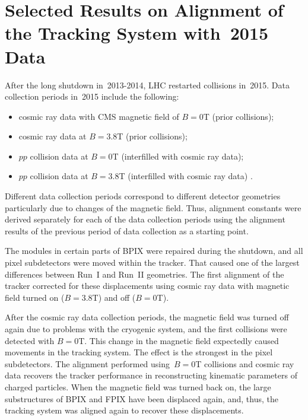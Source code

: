 \section{Selected Results on Alignment of the Tracking System with~2015 Data}
\label{sec:alignmentResults}

After the long shutdown in~2013-2014, LHC restarted collisions in~2015. Data collection periods in~2015 include the following:
\begin{itemize}
  \item cosmic ray data with CMS magnetic field of $B=$0T (prior collisions);
  \item cosmic ray data at $B=$3.8T (prior collisions);
  \item $pp$ collision data at $B=$0T (interfilled with cosmic ray data);
  \item $pp$ collision data at $B=$3.8T (interfilled with cosmic ray data) .
\end{itemize}

Different data collection periods correspond to different detector geometries particularly due to changes of the magnetic field. Thus, alignment constants were derived separately for each of the data collection periods using the alignment results of the previous period of data collection as a starting point. %

The modules in certain parts of BPIX were repaired during the shutdown, and all pixel subdetectors were moved within the tracker. That caused one of the largest differences between Run~I and Run~II geometries. The first alignment of the tracker corrected for these displacements using cosmic ray data with magnetic field turned on ($B=$3.8T) and off ($B=$0T).

After the cosmic ray data collection periods, the magnetic field was turned off again due to problems with the cryogenic system, and the first collisions were detected with $B=$0T. This change in the magnetic field expectedly caused movements in the tracking system. The effect is the strongest in the pixel subdetectors. The alignment performed using~$B=$0T collisions and cosmic ray data recovers the tracker performance in reconstructing kinematic parameters of charged particles. When the magnetic field was turned back on, the large substructures of BPIX and FPIX have been displaced again, and, thus, the tracking system was aligned again to recover these displacements.  

